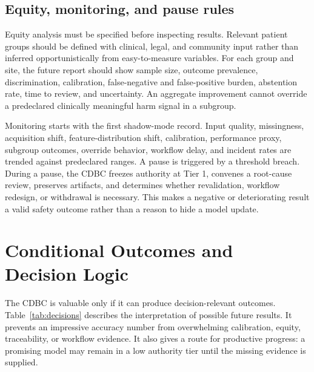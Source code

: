 \documentclass[conference]{IEEEtran}
\begin{document}
\subsection{Equity, monitoring, and pause rules}

Equity analysis must be specified before inspecting results. Relevant patient groups should be defined with clinical, legal, and community input rather than inferred opportunistically from easy-to-measure variables. For each group and site, the future report should show sample size, outcome prevalence, discrimination, calibration, false-negative and false-positive burden, abstention rate, time to review, and uncertainty. An aggregate improvement cannot override a predeclared clinically meaningful harm signal in a subgroup.

Monitoring starts with the first shadow-mode record. Input quality, missingness, acquisition shift, feature-distribution shift, calibration, performance proxy, subgroup outcomes, override behavior, workflow delay, and incident rates are trended against predeclared ranges. A pause is triggered by a threshold breach. During a pause, the CDBC freezes authority at Tier 1, convenes a root-cause review, preserves artifacts, and determines whether revalidation, workflow redesign, or withdrawal is necessary. This makes a negative or deteriorating result a valid safety outcome rather than a reason to hide a model update.

\section{Conditional Outcomes and Decision Logic}

The CDBC is valuable only if it can produce decision-relevant outcomes. Table~\ref{tab:decisions} describes the interpretation of possible future results. It prevents an impressive accuracy number from overwhelming calibration, equity, traceability, or workflow evidence. It also gives a route for productive progress: a promising model may remain in a low authority tier until the missing evidence is supplied.
\end{document}
